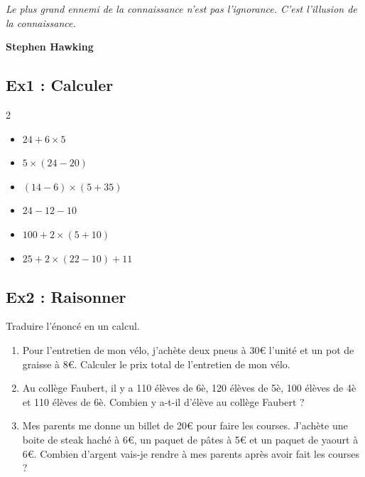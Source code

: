 



\begin{center}
  \textit{Le plus grand ennemi de la connaissance n'est pas l'ignorance. C'est l'illusion de la connaissance.} 
  
  \textbf{Stephen Hawking}
\end{center}

\subsection*{Ex1 : Calculer} 

\begin{multicols}{2}

\begin{itemize}[label={$\bullet$}]
  \item $24 + 6 \times 5$ \\
  \item $5 \times (24 - 20)$ \\
  \item $(14 - 6) \times (5 + 35)$ \\
  \item $24 - 12 - 10$ \\ 
  \item $100 + 2 \times (5 + 10)$ \\ 
  \item $25 + 2 \times (22 - 10) + 11$ 
\end{itemize}

\end{multicols}

\subsection*{Ex2 : Raisonner} 
Traduire l'énoncé en un calcul. 

\begin{enumerate}
  \item[1.] Pour l'entretien de mon vélo, j'achète deux pneus à 30€ l'unité et un pot de graisse à 8€. Calculer le prix total de l'entretien de mon vélo. 
  \item[2.] Au collège Faubert, il y a 110 élèves de 6è, 120 élèves de 5è, 100 élèves de 4è et 110 élèves de 6è. Combien y a-t-il d'élève au collège Faubert ?
  \item[3.] Mes parents me donne un billet de 20€ pour faire les courses. J'achète une boite de steak haché à 6€, un paquet de pâtes à 5€ et un paquet de yaourt à 6€. Combien d'argent vais-je rendre à mes parents après avoir fait les courses ? 
\end{enumerate}


